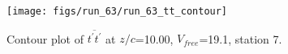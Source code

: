 \begin{figure}[H]
\centering
\texttt{[image: figs/run\_63/run\_63\_tt\_contour]}
\caption{Contour plot of $\overline{t^\prime t^\prime}$ at $z/c$=10.00, $V_{free}$=19.1, station 7.}
\end{figure}


